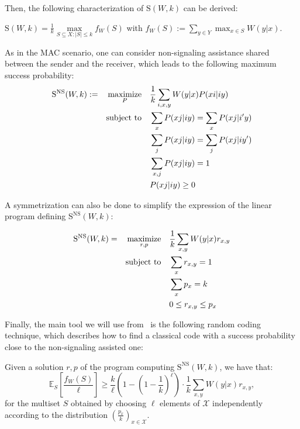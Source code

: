 Then, the following characterization of $\mathrm{S}(W,k)$ can be derived:

\begin{proposition}
  $\mathrm{S}(W,k) = \frac{1}{k} \underset{S \subseteq X: |S| \leq k}{\max} f_W(S)$ with $f_W(S) := \sum_{y \in Y} \max_{x \in S} W(y|x)$.
\end{proposition}

As in the MAC scenario, one can consider non-signaling assistance shared between the sender and the receiver, which leads to the following maximum success probability:
\begin{equation}
  \begin{aligned}
    \mathrm{S}^{\mathrm{NS}}(W,k) := &&\underset{P}{\operatorname{\text{maximize}}} &&& \frac{1}{k} \sum_{i,x,y} W(y|x)P(xi|iy)\\
    &&\operatorname{\text{subject to}} &&& \sum_{x} P(xj|iy) = \sum_{x} P(xj|i'y)\\
    &&&&& \sum_{j} P(xj|iy) = \sum_{j} P(xj|iy')\\
    &&&&& \sum_{x,j} P(xj|iy) = 1\\
    &&&&& P(xj|iy) \geq 0
  \end{aligned}
\end{equation}

A symmetrization can also be done to simplify the expression of the linear program defining $\mathrm{S}^{\mathrm{NS}}(W,k)$:

\begin{proposition}
  \label{prop:NSonewayLP}
  \begin{equation}
    \begin{aligned}
      \mathrm{S}^{\mathrm{NS}}(W,k) = &&\underset{r,p}{\operatorname{\text{maximize}}} &&& \frac{1}{k} \sum_{x,y} W(y|x)r_{x,y}\\
      &&\operatorname{\text{subject to}} &&& \sum_{x} r_{x,y} = 1\\
      &&&&& \sum_{x} p_{x} = k\\
      &&&&& 0 \leq r_{x,y} \leq p_{x}
    \end{aligned}
  \end{equation}
\end{proposition}

Finally, the main tool we will use from~\cite{BF18} is the following random coding technique, which describes how to find a classical code with a success probability close to the non-signaling assisted one:
\begin{theorem}
  \label{theo:RandomCoding}
  Given a solution $r,p$ of the program computing $\mathrm{S}^{\mathrm{NS}}(W,k)$, we have that:
  \[ \mathbb{E}_S\left[\frac{f_W(S)}{\ell}\right] \geq \frac{k}{\ell}\left(1-\left(1-\frac{1}{k}\right)^{\ell}\right) \cdot \frac{1}{k} \sum_{x,y} W(y|x)r_{x,y} , \]
  for the multiset $S$ obtained by choosing $\ell$ elements of $\mathcal{X}$ independently according to the distribution $\left(\frac{p_{x}}{k}\right)_{x \in \mathcal{X}}$.
\end{theorem}

